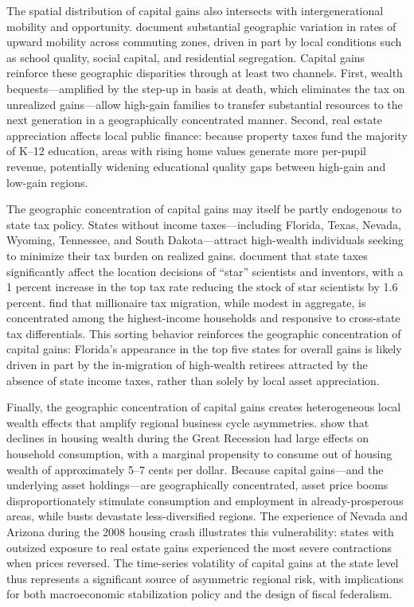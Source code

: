\documentclass[12pt]{article}
\begin{document}
The spatial distribution of capital gains also intersects with intergenerational mobility and opportunity. \citet{chetty2014land} document substantial geographic variation in rates of upward mobility across commuting zones, driven in part by local conditions such as school quality, social capital, and residential segregation. Capital gains reinforce these geographic disparities through at least two channels. First, wealth bequests---amplified by the step-up in basis at death, which eliminates the tax on unrealized gains---allow high-gain families to transfer substantial resources to the next generation in a geographically concentrated manner. Second, real estate appreciation affects local public finance: because property taxes fund the majority of K--12 education, areas with rising home values generate more per-pupil revenue, potentially widening educational quality gaps between high-gain and low-gain regions.

The geographic concentration of capital gains may itself be partly endogenous to state tax policy. States without income taxes---including Florida, Texas, Nevada, Wyoming, Tennessee, and South Dakota---attract high-wealth individuals seeking to minimize their tax burden on realized gains. \citet{moretti2017effect} document that state taxes significantly affect the location decisions of ``star'' scientists and inventors, with a 1 percent increase in the top tax rate reducing the stock of star scientists by 1.6 percent. \citet{young2016millionaire} find that millionaire tax migration, while modest in aggregate, is concentrated among the highest-income households and responsive to cross-state tax differentials. This sorting behavior reinforces the geographic concentration of capital gains: Florida's appearance in the top five states for overall gains is likely driven in part by the in-migration of high-wealth retirees attracted by the absence of state income taxes, rather than solely by local asset appreciation.

Finally, the geographic concentration of capital gains creates heterogeneous local wealth effects that amplify regional business cycle asymmetries. \citet{mian2013household} show that declines in housing wealth during the Great Recession had large effects on household consumption, with a marginal propensity to consume out of housing wealth of approximately 5--7 cents per dollar. Because capital gains---and the underlying asset holdings---are geographically concentrated, asset price booms disproportionately stimulate consumption and employment in already-prosperous areas, while busts devastate less-diversified regions. The experience of Nevada and Arizona during the 2008 housing crash illustrates this vulnerability: states with outsized exposure to real estate gains experienced the most severe contractions when prices reversed. The time-series volatility of capital gains at the state level thus represents a significant source of asymmetric regional risk, with implications for both macroeconomic stabilization policy and the design of fiscal federalism.
\end{document}
